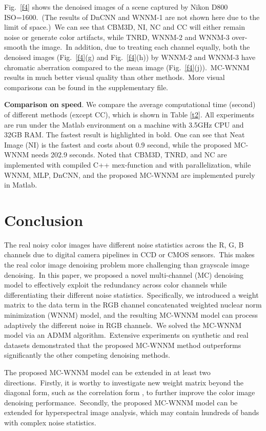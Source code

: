 Fig.\ \ref{f4} shows the denoised images of a scene captured by Nikon D800 ISO=1600.\ (The results of DnCNN and WNNM-1 are not shown here due to the limit of space.)\ We can see that CBM3D, NI, NC and CC will either remain noise or generate color artifacts, while TNRD, WNNM-2 and WNNM-3 over-smooth the image.\ In addition, due to treating each channel equally, both the denoised images (Fig.\ \ref{f4}(g) and Fig.\ \ref{f4}(h)) by WNNM-2 and WNNM-3 have chromatic aberration compared to the mean image (Fig.\ \ref{f4}(j)).\ MC-WNNM results in much better visual quality than other methods.\ More visual comparisons can be found in the supplementary file.

\textbf{Comparison on speed}. We compare the average computational time (second) of different methods (except CC), which is shown in Table \ref{t2}. All experiments are run under the Matlab environment on a machine with 3.5GHz CPU and 32GB RAM. The fastest result is highlighted in bold. One can see that Neat Image (NI) is the fastest and costs about 0.9 second, while the proposed MC-WNNM needs 202.9 seconds. Noted that CBM3D, TNRD, and NC are implemented with compiled C++ mex-function and with parallelization, while WNNM, MLP, DnCNN, and the proposed MC-WNNM are implemented purely in Matlab.


\section{Conclusion}

The real noisy color images have different noise statistics across the R, G, B channels due to digital camera pipelines in CCD or CMOS sensors.\ This makes the real color image denoising problem more challenging than grayscale image denoising.\ In this paper, we proposed a novel multi-channel (MC) denoising model to effectively exploit the redundancy across color channels while differentiating their different noise statistics.\ Specifically, we introduced a weight matrix to the data term in the RGB channel concatenated weighted nuclear norm minimization (WNNM) model, and the resulting MC-WNNM model can process adaptively the different noise in RGB channels.\ We solved the MC-WNNM model via an ADMM algorithm.\ Extensive experiments on synthetic and real datasets demonstrated that the proposed MC-WNNM method outperforms significantly the other competing denoising methods.

The proposed MC-WNNM model can be extended in at least two directions.\ Firstly, it is worthy to investigate new weight matrix beyond the diagonal form, such as the correlation form \cite{nearcor}, to further improve the color image denoising performance.\ Secondly, the proposed MC-WNNM model can be extended for hyperspectral image analysis, which may contain hundreds of bands with complex noise statistics.